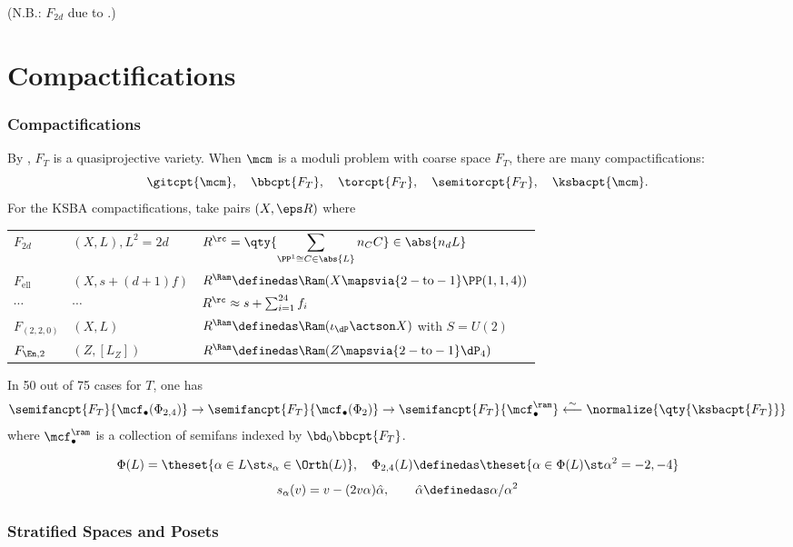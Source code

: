 \documentclass{beamer}
\begin{document}
{\begin{frame}
{\tiny
(N.B.: $F_{2d}$ due to \cite{Sca87, Laz16, AET23}.)
}

\end{frame}
\section{Compactifications}
\begin{frame}\frametitle{Compactifications}
By \cite{BB66}, $F_T$ is a quasiprojective variety.
When $\mcm$ is a moduli problem with coarse space $F_T$, there are many compactifications:
\[
\gitcpt{\mcm}, \quad
\bbcpt{F_T}, \quad 
\torcpt{F_T}, \quad
\semitorcpt{F_T}, \quad
\ksbacpt{\mcm}
.\]
For the KSBA compactifications, take pairs $(X, \eps R)$ where

{\small
\begin{tabular}{l|ll}
	$F_{2d}$ 
		& $(X, L), L^2=2d$
		& $R^{\rc} = \qty{ \displaystyle\sum_{\PP^1\cong C \in \abs{L}} n_C C}\in \abs{n_d L}$ 
		\\
	$F_{\mathrm{ell}}$ 
		& $(X, s + (d+1)f)$ 
		& $R^{\Ram} \definedas \Ram(X \mapsvia{2-\text{to}-1} \PP(1,1,4))$ 
		\\
	$\cdots$ 
		& $\cdots$ 
		& $R^{\rc} \approx s + \sum_{i=1}^{24} f_i$
		\\
	$F_{(2,2,0)}$ 
		& $(X, L)$ 
		& $R^{\Ram} \definedas \Ram(\iota_{\dP} \actson X)$ with $S = U(2)$
		\\
	$F_{\En, 2}$
		& $(Z, [L_Z])$ 
		& $R^{\Ram} \definedas \Ram(Z \mapsvia{2-\text{to}-1} \dP_4)$
		\\
\end{tabular}
}

\end{frame}
\begin{frame}
\begin{theorem}[{\cite[Thm. 9.10]{AE22}}]
In 50 out of 75 cases for $T$, one has
\[
\semifancpt{F_T}{\mcf_\bullet(\Phi_{2, 4})} \to
\semifancpt{F_T}{\mcf_\bullet(\Phi_2)} \to
\semifancpt{F_T}{\mcf_\bullet^{\ram}}
\overset{\sim}{\longleftarrow}
\normalize{\qty{ \ksbacpt{F_T}}} 
\]
where $\mcf_\bullet^{\ram}$ is a collection of semifans indexed by $\bd_0 \bbcpt{F_T}$.
\end{theorem}
\vspace{2em}
{\small
\begin{align*}
\Phi(L) = \theset{\alpha \in L \st s_\alpha \in \Orth(L)}, 
\quad
\Phi_{2, 4}(L) \definedas \theset{\alpha \in \Phi(L) \st \alpha^2 = -2, -4}
\end{align*}
\[
s_\alpha(v) = v - (2v\alpha) \hat{\alpha}, \qquad \hat{\alpha} \definedas \alpha/\alpha^2
\]
}
\end{frame}
\begin{frame}\frametitle{Stratified Spaces and Posets}
\end{frame}

}
\end{document}
